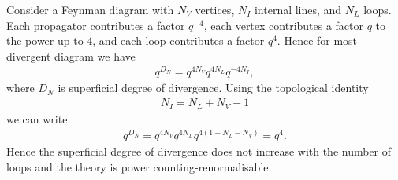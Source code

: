 \documentclass[aps,preprintnumbers,superscriptaddress,longbibliography]{revtex4-1}
\begin{document}
Consider a Feynman diagram with $N_V$ vertices, $N_I$ internal lines, and $N_L$ loops. Each propagator contributes a factor $q^{-4}$, each vertex contributes a factor $q$ to the power up to $4$, and each loop contributes a factor $q^4$. Hence for most divergent diagram we have
\begin{eqnarray}
q^{D_N}=q^{4N_V}q^{4N_L}q^{-4N_I},   
\end{eqnarray}
where $D_N$ is superficial degree of divergence. Using the topological identity
\begin{eqnarray}
N_I=N_L+N_V-1
\end{eqnarray}
we can write
\begin{eqnarray}
q^{D_N}=q^{4N_V}q^{4N_L}q^{4(1-N_L-N_V)}=q^4.   
\end{eqnarray}
Hence the superficial degree of divergence does not increase with the number of loops and the theory is power counting-renormalisable.
\end{document}
